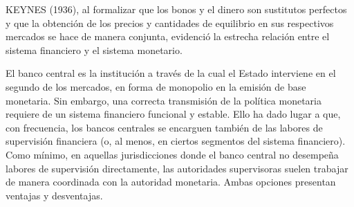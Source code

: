 \documentclass[10pt,a4paper]{article}
\begin{document}
KEYNES (1936), al formalizar que los bonos y el dinero son sustitutos perfectos y que la obtención de los precios y cantidades de equilibrio en sus respectivos mercados se hace de manera conjunta, evidenció la estrecha relación entre el sistema financiero y el sistema monetario. 

El banco central es la institución a través de la cual el Estado interviene en el segundo de los mercados, en forma de monopolio en la emisión de base monetaria. Sin embargo, una correcta transmisión de la política monetaria requiere de un sistema financiero funcional y estable. Ello ha dado lugar a que, con frecuencia, los bancos centrales se encarguen también de las labores de supervisión financiera (o, al menos, en ciertos segmentos del sistema financiero). Como mínimo, en aquellas jurisdicciones donde el banco central no desempeña labores de supervisión directamente, las autoridades supervisoras suelen trabajar de manera coordinada con la autoridad monetaria. Ambas opciones presentan ventajas y desventajas. 
\end{document}
